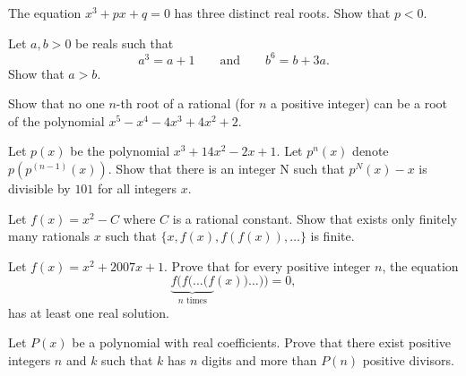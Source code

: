 \begin{question}[name={1992 Brazil}]
    The equation $x^3+px+q=0$ has three distinct real roots. Show that $p<0$.
\end{question}


\begin{question}[name={1994 Brazil}]
    Let $a, b > 0$ be reals such that
    \[ a^3=a+1 \qquad \text{and} \qquad  b^6=b+3a.  \]
    Show that $a>b$.
\end{question}


\begin{question}[name={1994 Brazil}]
    Show that no one $n$-th root of a rational (for $n$ a positive integer) can be a root of the polynomial $x^5 - x^4 - 4x^3 + 4x^2 + 2$.
\end{question}

\begin{question}[name={1996 Brazil}]
    Let $p(x)$ be the polynomial $x^3 + 14x^2 - 2x + 1$. Let $p^n(x)$ denote $p(p^(n-1)(x))$. Show that there is an integer N such that $p^N(x) - x$ is divisible by $101$ for all integers $x$.
\end{question}


\begin{question}[name={1997 Brazil}]
    Let $f(x)= x^2-C$ where $C$ is a rational constant.
    Show that exists only finitely many rationals $x$ such that 
    $\{x,f(x),f(f(x)),\dots\}$ is finite.
\end{question}

\begin{question}[name={2007 Brazil}]
    Let $ f(x) = x^2 + 2007x + 1$. Prove that for every positive integer $ n$, the equation \[\underbrace{f(f(\ldots(f}_{n \text{ times}}(x))\ldots)) = 0,\] has at least one real solution.
\end{question}

\begin{question}[name={2010 Brazil}]
    Let $P(x)$ be a polynomial with real coefficients. Prove that there exist positive integers $n$ and $k$ such that $k$ has $n$ digits and more than $P(n)$ positive divisors.
\end{question}




